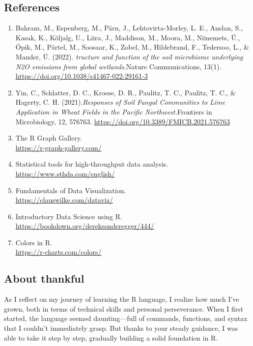 \documentclass[
]{article}
\begin{document}
\hypertarget{references}{%
\subsection{References}\label{references}}

\begin{enumerate}
\def\labelenumi{\arabic{enumi}.}
\item
  Bahram, M., Espenberg, M., Pärn, J., Lehtovirta-Morley, L. E., Anslan,
  S., Kasak, K., Kõljalg, U., Liira, J., Maddison, M., Moora, M.,
  Niinemets, Ü., Öpik, M., Pärtel, M., Soosaar, K., Zobel, M.,
  Hildebrand, F., Tedersoo, L., \& Mander, Ü. (2022). \emph{tructure and
  function of the soil microbiome underlying N2O emissions from global
  wetlands.}Nature Communications, 13(1).
  \url{https://doi.org/10.1038/s41467-022-29161-3}
\item
  Yin, C., Schlatter, D. C., Kroese, D. R., Paulitz, T. C., Paulitz, T.
  C., \& Hagerty, C. H. (2021).\emph{Responses of Soil Fungal
  Communities to Lime Application in Wheat Fields in the Pacific
  Northwest.}Frontiers in Microbiology, 12, 576763.
  \url{https://doi.org/10.3389/FMICB.2021.576763}
\item
  The R Graph Gallery.\\
  \url{https://r-graph-gallery.com/}
\item
  Statistical tools for high-throughput data analysis.\\
  \url{https://www.sthda.com/english/}
\item
  Fundamentals of Data Visualization.\\
  \url{https://clauswilke.com/dataviz/}
\item
  Introductory Data Science using R.\\
  \url{https://bookdown.org/dereksonderegger/444/}
\item
  Colors in R.\\
  \url{https://r-charts.com/colors/}
\end{enumerate}

\hypertarget{about-thankful}{%
\subsection{About thankful}\label{about-thankful}}

As I reflect on my journey of learning the R language, I realize how
much I've grown, both in terms of technical skills and personal
perseverance. When I first started, the language seemed daunting---full
of commands, functions, and syntax that I couldn't immediately grasp.
But thanks to your steady guidance, I was able to take it step by step,
gradually building a solid foundation in R.
\end{document}
